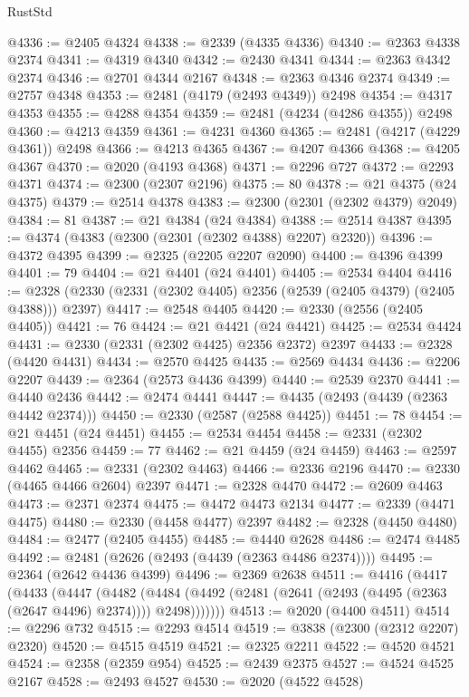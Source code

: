 \begin{lexlean}{RustStd}
\begin{coremodule}
@4336 := @2405 @4324
@4338 := @2339 (@4335 @4336)
@4340 := @2363 @4338 @2374
@4341 := @4319 @4340
@4342 := @2430 @4341
@4344 := @2363 @4342 @2374
@4346 := @2701 @4344 @2167
@4348 := @2363 @4346 @2374
@4349 := @2757 @4348
@4353 := @2481 (@4179 (@2493 @4349)) @2498
@4354 := @4317 @4353
@4355 := @4288 @4354
@4359 := @2481 (@4234 (@4286 @4355)) @2498
@4360 := @4213 @4359
@4361 := @4231 @4360
@4365 := @2481 (@4217 (@4229 @4361)) @2498
@4366 := @4213 @4365
@4367 := @4207 @4366
@4368 := @4205 @4367
@4370 := @2020 (@4193 @4368)
@4371 := @2296 @727
@4372 := @2293 @4371
@4374 := @2300 (@2307 @2196)
@4375 := 80
@4378 := @21 @4375 (@24 @4375)
@4379 := @2514 @4378
@4383 := @2300 (@2301 (@2302 @4379) @2049)
@4384 := 81
@4387 := @21 @4384 (@24 @4384)
@4388 := @2514 @4387
@4395 := @4374 (@4383 (@2300 (@2301 (@2302 @4388) @2207) @2320))
@4396 := @4372 @4395
@4399 := @2325 (@2205 @2207 @2090)
@4400 := @4396 @4399
@4401 := 79
@4404 := @21 @4401 (@24 @4401)
@4405 := @2534 @4404
@4416 := @2328 (@2330 (@2331 (@2302 @4405) @2356 (@2539 (@2405 @4379) (@2405 @4388))) @2397)
@4417 := @2548 @4405
@4420 := @2330 (@2556 (@2405 @4405))
@4421 := 76
@4424 := @21 @4421 (@24 @4421)
@4425 := @2534 @4424
@4431 := @2330 (@2331 (@2302 @4425) @2356 @2372) @2397
@4433 := @2328 (@4420 @4431)
@4434 := @2570 @4425
@4435 := @2569 @4434
@4436 := @2206 @2207
@4439 := @2364 (@2573 @4436 @4399)
@4440 := @2539 @2370
@4441 := @4440 @2436
@4442 := @2474 @4441
@4447 := @4435 (@2493 (@4439 (@2363 @4442 @2374)))
@4450 := @2330 (@2587 (@2588 @4425))
@4451 := 78
@4454 := @21 @4451 (@24 @4451)
@4455 := @2534 @4454
@4458 := @2331 (@2302 @4455) @2356
@4459 := 77
@4462 := @21 @4459 (@24 @4459)
@4463 := @2597 @4462
@4465 := @2331 (@2302 @4463)
@4466 := @2336 @2196
@4470 := @2330 (@4465 @4466 @2604) @2397
@4471 := @2328 @4470
@4472 := @2609 @4463
@4473 := @2371 @2374
@4475 := @4472 @4473 @2134
@4477 := @2339 (@4471 @4475)
@4480 := @2330 (@4458 @4477) @2397
@4482 := @2328 (@4450 @4480)
@4484 := @2477 (@2405 @4455)
@4485 := @4440 @2628
@4486 := @2474 @4485
@4492 := @2481 (@2626 (@2493 (@4439 (@2363 @4486 @2374))))
@4495 := @2364 (@2642 @4436 @4399)
@4496 := @2369 @2638
@4511 := @4416
    (@4417
      (@4433
        (@4447
          (@4482
            (@4484 (@4492 (@2481 (@2641 (@2493 (@4495 (@2363 (@2647 @4496) @2374)))) @2498)))))))
@4513 := @2020 (@4400 @4511)
@4514 := @2296 @732
@4515 := @2293 @4514
@4519 := @3838 (@2300 (@2312 @2207) @2320)
@4520 := @4515 @4519
@4521 := @2325 @2211
@4522 := @4520 @4521
@4524 := @2358 (@2359 @954)
@4525 := @2439 @2375
@4527 := @4524 @4525 @2167
@4528 := @2493 @4527
@4530 := @2020 (@4522 @4528)

\end{coremodule}
\end{lexlean}
